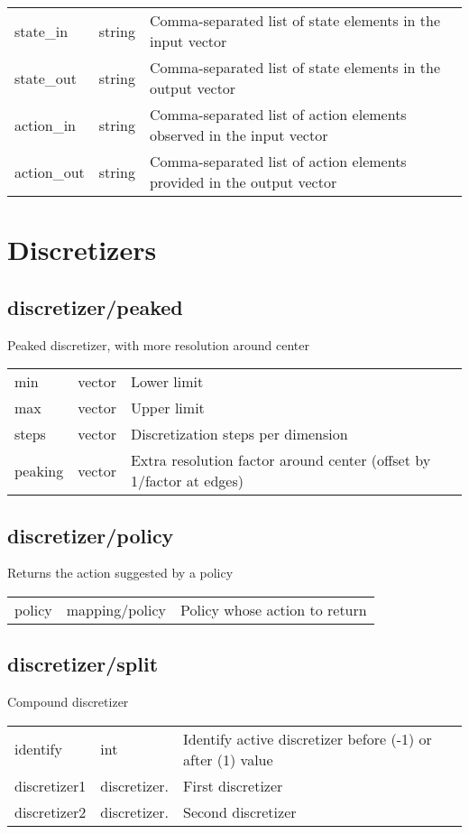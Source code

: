 \noindent\begin{tabular}{@{}lll@{}}
state\_in&string&Comma-separated list of state elements in the input vector\\
state\_out&string&Comma-separated list of state elements in the output vector\\
action\_in&string&Comma-separated list of action elements observed in the input vector\\
action\_out&string&Comma-separated list of action elements provided in the output vector\\
\end{tabular}
\section{Discretizers}
\subsection{discretizer/peaked}
\noindent Peaked discretizer, with more resolution around center\\

\noindent\begin{tabular}{@{}lll@{}}
min&vector&Lower limit\\
max&vector&Upper limit\\
steps&vector&Discretization steps per dimension\\
peaking&vector&Extra resolution factor around center (offset by 1/factor at edges)\\
\end{tabular}
\subsection{discretizer/policy}
\noindent Returns the action suggested by a policy\\

\noindent\begin{tabular}{@{}lll@{}}
policy&mapping/policy&Policy whose action to return\\
\end{tabular}
\subsection{discretizer/split}
\noindent Compound discretizer\\

\noindent\begin{tabular}{@{}lll@{}}
identify&int&Identify active discretizer before (-1) or after (1) value\\
discretizer1&discretizer.&First discretizer\\
discretizer2&discretizer.&Second discretizer\\
\end{tabular}
